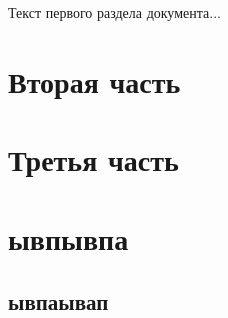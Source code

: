 \documentclass[paper=a4, fontsize=14pt, pagesize, DIV=calc, oneside]{scrreport}
\begin{document}


Текст первого раздела документа...





\chapter{Вторая часть}












\chapter{Третья часть}












\chapter{ывпывпа}














\section{ывпаывап}
\end{document}
